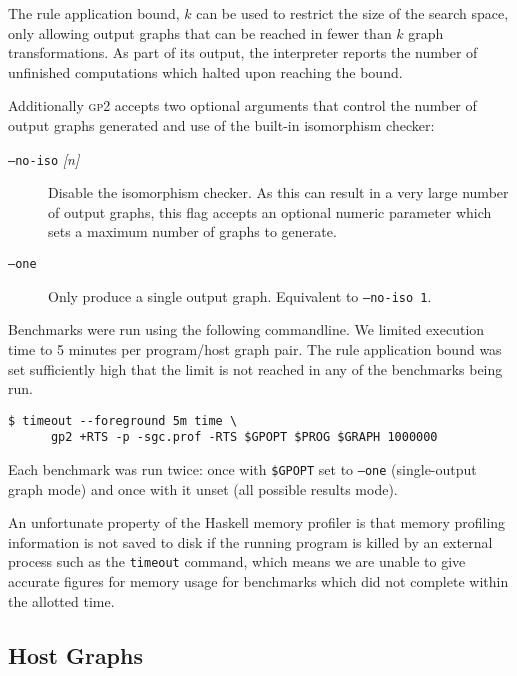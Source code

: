 The rule application bound, $k$ can be used to restrict the size of the search space, only allowing output graphs that can be reached in fewer than $k$ graph transformations. As part of its output, the interpreter reports the number of unfinished computations which halted upon reaching the bound.


Additionally \textsc{gp2} accepts two optional arguments that control the number of output graphs generated and use of the built-in isomorphism checker:

\begin{description}
	\item[\texttt{--no-iso} \textit{[n]}]  Disable the isomorphism checker. As this can result in a very large number of output graphs, this flag accepts an optional numeric parameter which sets a maximum number of graphs to generate.

	\item[\texttt{--one}] Only produce a single output graph. Equivalent to \texttt{--no-iso 1}.
\end{description}

Benchmarks were run using the following commandline. We limited execution time to 5 minutes per program/host graph pair. The rule application bound was set sufficiently high that the limit is not reached in any of the benchmarks being run.

\begin{verbatim}
$ timeout --foreground 5m time \
      gp2 +RTS -p -sgc.prof -RTS $GPOPT $PROG $GRAPH 1000000
\end{verbatim}

Each benchmark was run twice: once with \texttt{\$GPOPT} set to \texttt{--one} (single-output graph mode) and once with it unset (all possible results mode).

An unfortunate property of the Haskell memory profiler is that memory profiling information is not saved to disk if the running program is killed by an external process such as the \texttt{timeout} command, which means we are unable to give accurate figures for memory usage for benchmarks which did not complete within the allotted time.


\subsection{Host Graphs}
\label{subsec:hosts}

